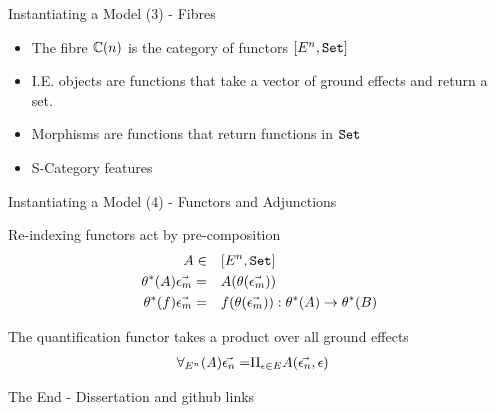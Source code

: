 \documentclass{beamer}
\newcommand\script[1]{}
\begin{document}
\begin{frame}{Instantiating a Model (3) - Fibres}
    \begin{itemize}
        \item The fibre $\mathbb{C}(n)$ is the category of functors $[E^n, \texttt{Set}]$
        \item I.E. objects are functions that take a vector of ground effects and return a set.
        \item Morphisms are functions that return functions in $\texttt{Set}$
        \item S-Category features
    \end{itemize}

    \script{
        - Now we can think about the fibres
        - These are functor categories
        - I.E. their objects are functions returning sets and their morphisms are dependently typed functions
        - We can construct all the of the S-Category structure  as pointwise
    }
\end{frame}

\begin{frame}{Instantiating a Model (4) - Functors and Adjunctions}

    Re-indexing functors act by pre-composition
    \begin{align*}
        A\in&\quad [E^n, \texttt{Set}]\\
        \theta^*(A) \vec{\epsilon_m} =&\quad  A(\theta(\vec{\epsilon_m}))\\
        \theta^*(f) \vec{\epsilon_m} =&\quad f(\theta(\vec{\epsilon_m})): \theta^*(A) \rightarrow \theta^*(B)\\
    \end{align*}


    The quantification functor takes a product over all ground effects
    \begin{align*}
        \forall_{E^n}(A)\vec{\epsilon_n} =&\Pi_{\epsilon\in E}{A(\vec{\epsilon_n}, \epsilon)}
    \end{align*}

    \script{
        - Finally, we need to construct the various functors
        - Reindexing functors are done using precomposition
        - quantification consists of a product over all ground effects
    }
\end{frame}

\begin{frame}{The End}
    - Dissertation and github links

    \script{Thanks}
    
\end{frame}
\end{document}

